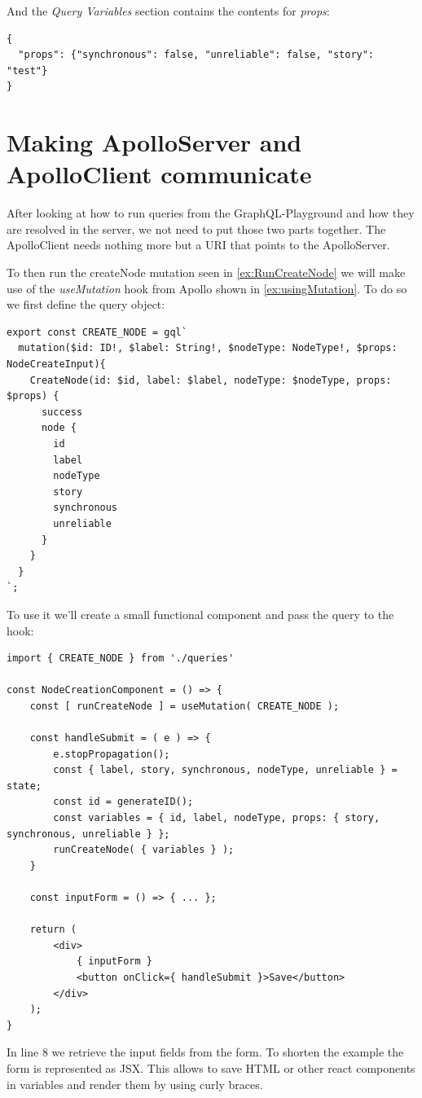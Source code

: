 And the \emph{Query Variables} section contains the contents for \emph{props}:
\begin{lstlisting}
{
  "props": {"synchronous": false, "unreliable": false, "story": "test"}
}
\end{lstlisting}

\section{Making ApolloServer and ApolloClient communicate}
After looking at how to run queries from the GraphQL-Playground and how they are resolved in the server, we not need to put those two parts together. The ApolloClient needs nothing more but a URI that points to the ApolloServer.

To then run the createNode mutation seen in \autoref{ex:RunCreateNode} we will make use of the \emph{useMutation} hook from Apollo shown in \autoref{ex:usingMutation}. To do so we first define the query object:

\begin{lstlisting}[label={ex:DefQuery}]
export const CREATE_NODE = gql`
  mutation($id: ID!, $label: String!, $nodeType: NodeType!, $props: NodeCreateInput){
    CreateNode(id: $id, label: $label, nodeType: $nodeType, props: $props) {
      success
      node {
        id
        label
        nodeType
        story
        synchronous
        unreliable
      }
    }
  }
`;
\end{lstlisting}

To use it we'll create a small functional component and pass the query to the hook:

\begin{lstlisting}[caption={Using the Query in a Component}]
import { CREATE_NODE } from './queries'

const NodeCreationComponent = () => {
	const [ runCreateNode ] = useMutation( CREATE_NODE );
	
	const handleSubmit = ( e ) => {
		e.stopPropagation();
		const { label, story, synchronous, nodeType, unreliable } = state; 
		const id = generateID();
		const variables = { id, label, nodeType, props: { story, synchronous, unreliable } }; 
		runCreateNode( { variables } );
	}
	
	const inputForm = () => { ... };
	
	return (
		<div>
			{ inputForm }
			<button onClick={ handleSubmit }>Save</button>
		</div>	
	);
}
\end{lstlisting}
In line 8 we retrieve the input fields from the form. To shorten the example the form is represented as JSX. This allows to save HTML or other react components in variables and render them by using curly braces.

